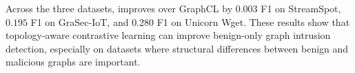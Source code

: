 Across the three datasets, \sysname{} improves over GraphCL by $0.003$ F1 on StreamSpot, $0.195$ F1 on GraSec-IoT, and $0.280$ F1 on Unicorn Wget. These results show that topology-aware contrastive learning can improve benign-only graph intrusion detection, especially on datasets where structural differences between benign and malicious graphs are important.
